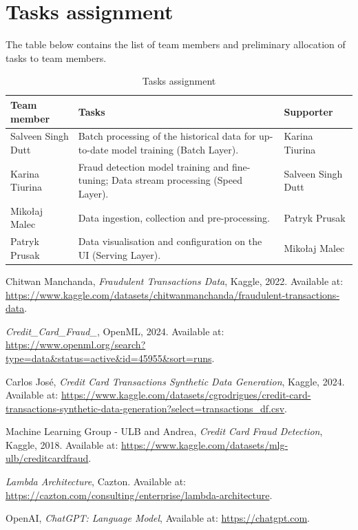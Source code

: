 \documentclass[12pt,a4paper, hidelinks]{article}
\begin{document}
\newpage

\section{Tasks assignment}

The table below contains the list of team members and preliminary allocation of tasks to team members.

\begin{table}[htbp]
\centering
\begin{tabular}{|p{4cm}|p{6cm}|p{4cm}|}
\hline
\textbf{Team member} & \textbf{Tasks} & \textbf{Supporter} \\
\hline
Salveen Singh Dutt & Batch processing of the historical data for up-to-date model training (Batch Layer). & Karina Tiurina \\
\hline
Karina Tiurina & Fraud detection model training and fine-tuning; Data stream processing (Speed Layer). & Salveen Singh Dutt \\
\hline
Mikołaj Malec & Data ingestion, collection and pre-processing. & Patryk Prusak  \\
\hline
Patryk Prusak & Data visualisation and configuration on the UI (Serving Layer). & Mikołaj Malec \\
\hline
\end{tabular}
\caption{Tasks assignment}
\end{table}

\newpage

\begin{thebibliography}{9}

    Chitwan Manchanda,
    \textit{Fraudulent Transactions Data},
    Kaggle, 2022.
    Available at: \url{https://www.kaggle.com/datasets/chitwanmanchanda/fraudulent-transactions-data}.
    
    \textit{Credit\_Card\_Fraud\_},
    OpenML, 2024.
    Available at: \url{https://www.openml.org/search?type=data&status=active&id=45955&sort=runs}.

    Carlos José,
    \textit{Credit Card Transactions Synthetic Data Generation},
    Kaggle, 2024.
    Available at: \url{https://www.kaggle.com/datasets/cgrodrigues/credit-card-transactions-synthetic-data-generation?select=transactions_df.csv}.
    
    Machine Learning Group - ULB and Andrea,
    \textit{Credit Card Fraud Detection},
    Kaggle, 2018.
    Available at: \url{https://www.kaggle.com/datasets/mlg-ulb/creditcardfraud}.
    

    \textit{Lambda Architecture},
    Cazton.
    Available at: \url{https://cazton.com/consulting/enterprise/lambda-architecture}.

    OpenAI,
    \textit{ChatGPT: Language Model},
    Available at: \url{https://chatgpt.com}.
    
    \end{thebibliography}
\end{document}

